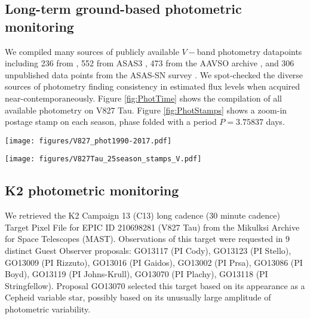 \documentclass[revtex4]{emulateapj}%
\begin{document}
\subsection{Long-term ground-based photometric monitoring} \label{sec:archival_phot}

We compiled many sources of publicly available $V-$band photometry datapoints including 236 from \citep{grankin08}, 552 from ASAS3 \citep{pojmanski04}, 473 from the AAVSO archive \citep{kafka16}, and 306 unpublished data points from the ASAS-SN survey \citep{shappee14}.  We spot-checked the diverse sources of photometry finding consistency in estimated flux levels when acquired near-contemporaneously. Figure \ref{fig:PhotTime} shows the compilation of all available photometry on V827 Tau.  Figure \ref{fig:PhotStamps} shows a zoom-in postage stamp on each season, phase folded with a period $P=3.75837$ days.

\begin{figure*}
 \centering
 \texttt{[image: figures/V827\_phot1990-2017.pdf]}
 \caption{Compilation of archival and new flux measurements in $V-$band for V827 Tau, normalized to the global maximum flux value, which occurred in 1990.  The y-axis equals the minimum starspot area, when flux deficits are interpreted with the simplest possible analytic starspot model.}
 \label{fig:PhotTime}
\end{figure*}

\begin{figure*}
 \centering
 \texttt{[image: figures/V827Tau\_25season\_stamps\_V.pdf]}
 \caption{Phase-folded $V-$band flux measurements of V827 Tau grouped into 25 observing seasons, and normalized to the global maximum in 1990.  The y-axis equals the minimum starspot area, when flux deficits are interpreted with the simplest possible analytic starspot model.}
 \label{fig:PhotStamps}
\end{figure*}

\subsection{K2 photometric monitoring} \label{sec:K2_obs}

We retrieved the K2 Campaign 13 (C13) \cite{2014PASP..126..398H} long cadence (30 minute cadence) Target Pixel File for EPIC ID 210698281 (V827 Tau) from the Mikulksi Archive for Space Telescopes (MAST).  Observations of this target were requested in 9 distinct Guest Observer proposals: GO13117 (PI Cody), GO13123 (PI Stello), GO13009 (PI Rizzuto), GO13016 (PI Gaidos), GO13002 (PI Prsa), GO13086 (PI Boyd), GO13119 (PI Johns-Krull), GO13070 (PI Plachy), GO13118 (PI Stringfellow).  Proposal GO13070 selected this target based on its appearance as a Cepheid variable star, possibly based on its unusually large amplitude of photometric variability.
\end{document}
